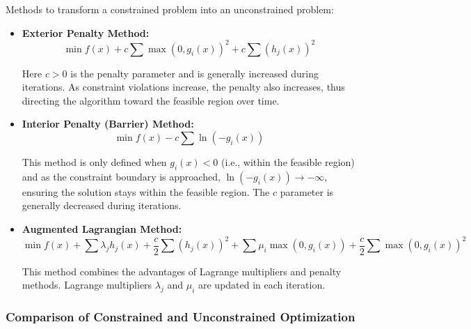 \begin{tcolorbox}[title=Handling Constraints]
Methods to transform a constrained problem into an unconstrained problem:

\begin{itemize}
    \item \textbf{Exterior Penalty Method:} 
    \begin{equation}
    \min f(x) + c\sum\max(0,g_i(x))^2 + c\sum(h_j(x))^2
    \end{equation}
    
    Here $c > 0$ is the penalty parameter and is generally increased during iterations. As constraint violations increase, the penalty also increases, thus directing the algorithm toward the feasible region over time.
    
    \item \textbf{Interior Penalty (Barrier) Method:} 
    \begin{equation}
    \min f(x) - c\sum\ln(-g_i(x))
    \end{equation}
    
    This method is only defined when $g_i(x) < 0$ (i.e., within the feasible region) and as the constraint boundary is approached, $\ln(-g_i(x)) \to -\infty$, ensuring the solution stays within the feasible region. The $c$ parameter is generally decreased during iterations.
    
    \item \textbf{Augmented Lagrangian Method:} 
    \begin{equation}
    \min f(x) + \sum\lambda_j h_j(x) + \frac{c}{2}\sum(h_j(x))^2 + \sum\mu_i\max(0,g_i(x)) + \frac{c}{2}\sum\max(0,g_i(x))^2
    \end{equation}
    
    This method combines the advantages of Lagrange multipliers and penalty methods. Lagrange multipliers $\lambda_j$ and $\mu_i$ are updated in each iteration.
\end{itemize}
\end{tcolorbox}

\subsubsection{Comparison of Constrained and Unconstrained Optimization}

